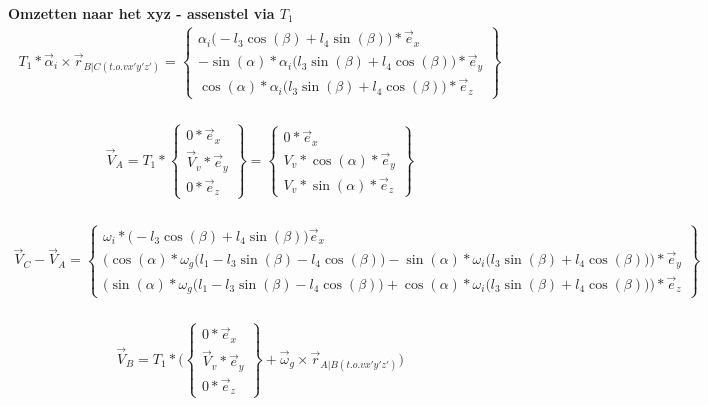 \documentclass[a4paper,10pt]{article}
\begin{document}
\textbf{Omzetten naar het xyz - assenstel via $T_1$}
\begin{equation}
	\begin{aligned}
		{T}_{1}*\vec{\alpha}_i \times \vec{r}_{B|C(t.o.v x'y'z')} = \begin{Bmatrix}
			{\alpha_i \Big(- l_3 \cos(\beta) + l_4 \sin(\beta)\Big)*\vec{e}_{x}}\\
			-\sin(\alpha)*	\alpha_i \Big(l_3 \sin(\beta) + l_4 \cos(\beta)\Big)*\vec{e}_{y}\\
			\cos(\alpha)*\alpha_i \Big(l_3 \sin(\beta) + l_4 \cos(\beta)\Big)*\vec{e}_{z}
		\end{Bmatrix}
	\end{aligned}
\end{equation}\\
\begin{equation}
	\begin{aligned}
		\vec{V}_A = {T}_{1}* \begin{Bmatrix}
			{0*\vec{e}_{x}}\\
			\vec{V}_v*\vec{e}_{y}\\
			0*\vec{e}_{z}
		\end{Bmatrix} = \begin{Bmatrix}
		{0*\vec{e}_{x}}\\
		V_v*\cos(\alpha)*\vec{e}_{y}\\
		V_v*\sin(\alpha)*\vec{e}_{z}
	\end{Bmatrix}
\end{aligned}
\end{equation}\\
\begin{equation}
	\begin{aligned}
		\vec{V}_C -\vec{V}_A = \begin{Bmatrix}
			{\omega_i*\Big( - l_3 \cos(\beta) + l_4 \sin(\beta)\Big)\vec{e}_{x}}\\
			\Big(\cos(\alpha)*\omega_g \Big(l_1 - l_3 \sin(\beta) - l_4 \cos(\beta)\Big) -\sin(\alpha)*	\omega_i \Big(l_3 \sin(\beta) + l_4 \cos(\beta)\Big)\Big)*\vec{e}_{y}\\
			\Big(\sin(\alpha)*\omega_g \Big(l_1 - l_3 \sin(\beta) - l_4 \cos(\beta)\Big) +\cos(\alpha)*	\omega_i \Big(l_3 \sin(\beta) + l_4 \cos(\beta)\Big)\Big)*\vec{e}_{z}
		\end{Bmatrix} 
	\end{aligned}
\end{equation}\\
\begin{equation}
	\begin{aligned}
		\vec{V}_B = {T}_{1}* \Big(\begin{Bmatrix}
			{0*\vec{e}_{x}}\\
			\vec{V}_v*\vec{e}_{y}\\
			0*\vec{e}_{z} 
		\end{Bmatrix} + \vec{\omega}_g \times \vec{r}_{A|B(t.o.v x'y'z')}\Big)
	\end{aligned}
\end{equation}\\
\end{document}
